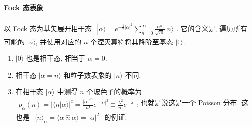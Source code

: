 \documentclass[../../main.tex]{subfiles}
\begin{document}
\paragraph{Fock 态表象}
以 Fock 态为基矢展开相干态 $\begin{aligned}
    |\alpha\rangle = e^{-\frac{1}{2}|\alpha|^{2}}\sum_{n=0}^{\infty}\frac{\alpha^{n}}{\sqrt{n!}}|n\rangle
\end{aligned}$. 它的含义是, 遍历所有可能的 $|n\rangle$, 并使用对应的 $n$ 个湮灭算符将其降阶至基态 $|0\rangle$. 
\begin{enumerate}
    \item $|0\rangle$ 也是相干态, 相当于 $\alpha=0$.
    \item 相干态 $|\alpha=n\rangle$ 和粒子数表象的 $|n\rangle$ 不同.
    \item 在相干态 $|\alpha\rangle$ 中测得 $n$ 个玻色子的概率为 $\begin{aligned}
        p_{\alpha}(n) = |\langle n|\alpha\rangle|^{2} = \frac{|\alpha|^{2n}}{n!}e^{-|\alpha|^{2}}\equiv \frac{\lambda^{2}}{n!}e^{-\lambda}
    \end{aligned}$, 也就是说这是一个 Poisson 分布. 这也是 $\begin{aligned}
        \langle n\rangle_{\alpha} = \langle\alpha|\hat{n}|\alpha\rangle = |\alpha|^{2}
    \end{aligned}$ 的例证.
\end{enumerate}
\end{document}

